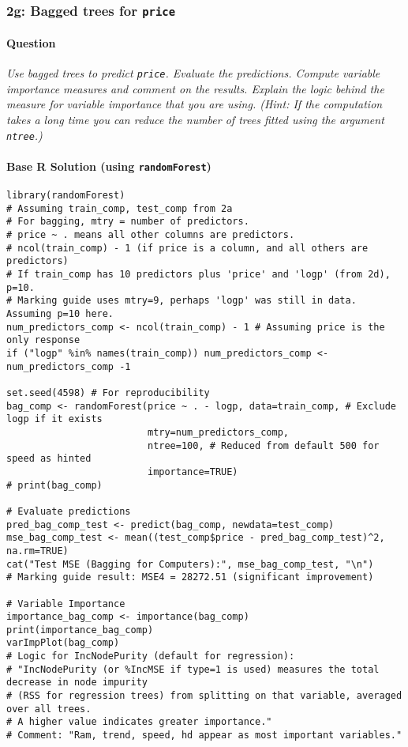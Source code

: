 \documentclass[12pt,a4paper]{article}
\newcommand{\Rpackage}[1]{\texttt{#1}} %
\newcommand{\Rcode}[1]{\texttt{#1}} %
\begin{document}
    \subsubsection{2g: Bagged trees for \Rcode{price}}
        \paragraph{Question}
        \textit{Use bagged trees to predict \Rcode{price}. Evaluate the predictions. Compute variable importance measures and comment on the results. Explain the logic behind the measure for variable importance that you are using. (Hint: If the computation takes a long time you can reduce the number of trees fitted using the argument \Rcode{ntree}.)}
        \paragraph{Base R Solution (using \Rpackage{randomForest})}
\begin{lstlisting}
library(randomForest)
# Assuming train_comp, test_comp from 2a
# For bagging, mtry = number of predictors.
# price ~ . means all other columns are predictors.
# ncol(train_comp) - 1 (if price is a column, and all others are predictors)
# If train_comp has 10 predictors plus 'price' and 'logp' (from 2d), p=10.
# Marking guide uses mtry=9, perhaps 'logp' was still in data. Assuming p=10 here.
num_predictors_comp <- ncol(train_comp) - 1 # Assuming price is the only response
if ("logp" %in% names(train_comp)) num_predictors_comp <- num_predictors_comp -1

set.seed(4598) # For reproducibility
bag_comp <- randomForest(price ~ . - logp, data=train_comp, # Exclude logp if it exists
                         mtry=num_predictors_comp, 
                         ntree=100, # Reduced from default 500 for speed as hinted
                         importance=TRUE)
# print(bag_comp)

# Evaluate predictions
pred_bag_comp_test <- predict(bag_comp, newdata=test_comp)
mse_bag_comp_test <- mean((test_comp$price - pred_bag_comp_test)^2, na.rm=TRUE)
cat("Test MSE (Bagging for Computers):", mse_bag_comp_test, "\n")
# Marking guide result: MSE4 = 28272.51 (significant improvement)

# Variable Importance
importance_bag_comp <- importance(bag_comp)
print(importance_bag_comp)
varImpPlot(bag_comp)
# Logic for IncNodePurity (default for regression):
# "IncNodePurity (or %IncMSE if type=1 is used) measures the total decrease in node impurity
# (RSS for regression trees) from splitting on that variable, averaged over all trees.
# A higher value indicates greater importance."
# Comment: "Ram, trend, speed, hd appear as most important variables."
\end{lstlisting}
\end{document}
